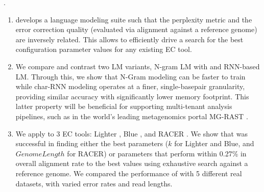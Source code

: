 . 
\vspace{-6pt}
\begin{enumerate}
\item \name develops a language modeling suite such that the perplexity metric and the error correction quality (evaluated via alignment against a reference genome) are inversely related. This allows \name to efficiently drive a search for the best configuration parameter values for any existing EC tool. 
\vspace{-8pt}

\item We compare and contrast two LM variants, N-gram LM with and RNN-based LM. Through this, we show that N-Gram modeling can be faster to train while char-RNN modeling operates at a finer, single-basepair granularity, providing similar accuracy with significantly lower memory footprint. 
This latter property will be beneficial for supporting multi-tenant analysis pipelines, such as in the world's leading metagenomics portal MG-RAST \cite{meyer2017mg}.
\vspace{-8pt}

\item We apply \name to 3 EC tools: Lighter \cite{song2014lighter}, Blue \cite{greenfield2014blue}, and RACER \cite{ilie2013racer}. We show that \name was successful in finding either the best parameters ($k$ for Lighter and Blue, and $Genome Length$ for RACER) or parameters that perform within 0.27\% in overall alignment rate to the best values using exhaustive search against a reference genome. We compared the performance of \name with 5 different real datasets, with varied error rates and read lengths. %

\end{enumerate}



